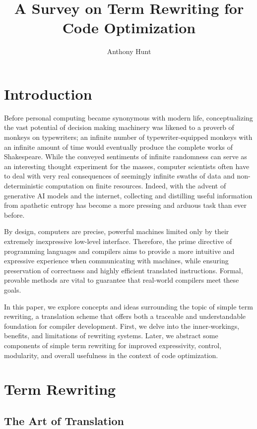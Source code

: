 \documentclass{article}
\title{A Survey on Term Rewriting for Code Optimization}
\author{Anthony Hunt}
\begin{document}
\maketitle
\tableofcontents
\newpage

\section{Introduction}
Before personal computing became synonymous with modern life,
conceptualizing the vast potential of decision making machinery
was likened to a proverb of monkeys on typewriters;
an infinite number of typewriter-equipped monkeys with an infinite amount of time would eventually produce the complete works of Shakespeare.
While the conveyed sentiments of infinite randomness can serve as an interesting thought experiment for the masses,
computer scientists often have to deal with very real consequences of seemingly infinite swaths of data and non-deterministic computation on finite resources.
Indeed, with the advent of generative AI models and the internet, collecting and distilling useful information from apathetic entropy
has become a more pressing and arduous task than ever before.

By design,
computers are precise, powerful machines limited only by
their extremely inexpressive low-level interface.
Therefore, the prime directive of programming languages and compilers
aims to provide a more intuitive and expressive experience when communicating with machines,
while ensuring preservation of correctness and
highly efficient translated instructions.
Formal, provable methods are vital to guarantee that
real-world compilers meet these goals.

In this paper, we explore concepts and ideas surrounding the topic of simple term rewriting,
a translation scheme that offers both a traceable and understandable foundation for compiler development.
First, we delve into the inner-workings, benefits, and limitations of rewriting systems. Later,
we abstract some components of simple term rewriting for improved expressivity, control,
modularity, and overall usefulness in the context of code optimization.

\section{Term Rewriting}

\subsection{The Art of Translation}
\end{document}
